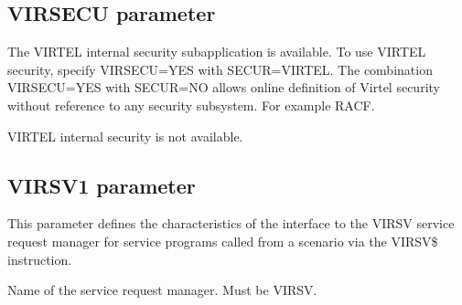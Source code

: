 \documentclass[letterpaper,10pt,english]{sphinxmanual}
\begin{document}
\subsection{VIRSECU parameter}
\label{\detokenize{Installation_Guide:virsecu-parameter}}\label{\detokenize{Installation_Guide:index-136}}
\begin{sphinxVerbatim}[commandchars=\\\{\}]
 
\end{sphinxVerbatim}

\sphinxAtStartPar
{} \sphinxhyphen{} The VIRTEL internal security sub\sphinxhyphen{}application is available. To use VIRTEL security, specify VIRSECU=YES with SECUR=VIRTEL. The combination VIRSECU=YES with SECUR=NO allows online definition of Virtel security without reference to any security subsystem. For example RACF.

\sphinxAtStartPar
{} \sphinxhyphen{} VIRTEL internal security is not available.

\ignorespaces 

\subsection{VIRSV1 parameter}
\label{\detokenize{Installation_Guide:virsv1-parameter}}\label{\detokenize{Installation_Guide:index-137}}
\begin{sphinxVerbatim}[commandchars=\\\{\}]
 
\end{sphinxVerbatim}

\sphinxAtStartPar
This parameter defines the characteristics of the interface to the VIRSV service request manager for service programs called from a scenario via the VIRSV\$ instruction.

\sphinxAtStartPar
{} \sphinxhyphen{} Name of the service request manager. Must be VIRSV.

\ignorespaces 
\end{document}
